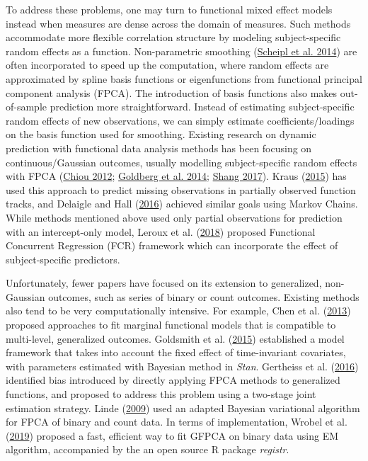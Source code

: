 \documentclass[
  11pt,
]{article}
\begin{document}
To address these problems, one may turn to functional mixed effect
models instead when measures are dense across the domain of measures.
Such methods accommodate more flexible correlation structure by modeling
subject-specific random effects as a function. Non-parametric smoothing
(\protect\hyperlink{ref-Scheipl2014}{Scheipl et al. 2014}) are often
incorporated to speed up the computation, where random effects are
approximated by spline basis functions or eigenfunctions from functional
principal component analysis (FPCA). The introduction of basis functions
also makes out-of-sample prediction more straightforward. Instead of
estimating subject-specific random effects of new observations, we can
simply estimate coefficients/loadings on the basis function used for
smoothing. Existing research on dynamic prediction with functional data
analysis methods has been focusing on continuous/Gaussian outcomes,
usually modelling subject-specific random effects with FPCA
(\protect\hyperlink{ref-chiou2012}{Chiou 2012};
\protect\hyperlink{ref-goldberg2014}{Goldberg et al. 2014};
\protect\hyperlink{ref-shang2017}{Shang 2017}). Kraus
(\protect\hyperlink{ref-kraus2015}{2015}) has used this approach to
predict missing observations in partially observed function tracks, and
Delaigle and Hall (\protect\hyperlink{ref-delaigo2016}{2016}) achieved
similar goals using Markov Chains. While methods mentioned above used
only partial observations for prediction with an intercept-only model,
Leroux et al. (\protect\hyperlink{ref-leroux2016}{2018}) proposed
Functional Concurrent Regression (FCR) framework which can incorporate
the effect of subject-specific predictors.

Unfortunately, fewer papers have focused on its extension to
generalized, non-Gaussian outcomes, such as series of binary or count
outcomes. Existing methods also tend to be very computationally
intensive. For example, Chen et al.
(\protect\hyperlink{ref-chen2013}{2013}) proposed approaches to fit
marginal functional models that is compatible to multi-level,
generalized outcomes. Goldsmith et al.
(\protect\hyperlink{ref-goldsmith2015}{2015}) established a model
framework that takes into account the fixed effect of time-invariant
covariates, with parameters estimated with Bayesian method in
\emph{Stan}. Gertheiss et al.
(\protect\hyperlink{ref-gertheiss2016}{2016}) identified bias introduced
by directly applying FPCA methods to generalized functions, and proposed
to address this problem using a two-stage joint estimation strategy.
Linde (\protect\hyperlink{ref-linde2019}{2009}) used an adapted Bayesian
variational algorithm for FPCA of binary and count data. In terms of
implementation, Wrobel et al. (\protect\hyperlink{ref-wrobel2019}{2019})
proposed a fast, efficient way to fit GFPCA on binary data using EM
algorithm, accompanied by the an open source R package \emph{registr}.
\end{document}
